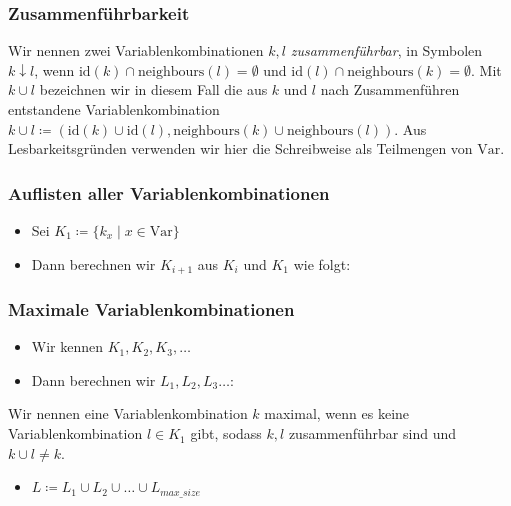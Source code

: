 \documentclass[onlymath]{beamer}
\begin{document}
\begin{frame}
	\frametitle{Zusammenführbarkeit}

	\begin{definition}[zusammenführbar]
		Wir nennen zwei Variablenkombinationen $k, l$ \emph{zusammenführbar}, in Symbolen $k \downarrow l$, wenn \pause $\mathrm{id}(k) \cap \mathrm{neighbours}(l) = \emptyset$ und \pause $\mathrm{id}(l) \cap \mathrm{neighbours}(k) = \emptyset$. \pause Mit $k \cup l$ bezeichnen wir in diesem Fall die aus $k$ und $l$ nach Zusammenführen entstandene Variablenkombination  $k \cup l \coloneqq (\mathrm{id}(k) \cup \mathrm{id}(l), \mathrm{neighbours}(k) \cup \mathrm{neighbours}(l))$. \pause Aus Lesbarkeitsgründen verwenden wir hier die Schreibweise als Teilmengen von $\mathrm{Var}$.
	\end{definition}
\end{frame}

\begin{frame}
	\frametitle{Auflisten aller Variablenkombinationen}
	\begin{itemize}
		\item Sei $K_1 \coloneqq \{k_x \mid x\in \mbox{Var} \}$ \pause
		\item Dann berechnen wir $K_{i+1}$ aus $K_i$ und $K_1$ wie folgt: \pause
	\end{itemize} 
\centering
\end{frame}

\begin{frame}
	\frametitle{Maximale Variablenkombinationen}
	\begin{itemize}
		\item Wir kennen $K_1, K_2, K_3, \dots $ \pause
		\item Dann berechnen wir $L_1, L_2, L_3 \dots$: \pause
	\end{itemize}
\begin{definition}
	Wir nennen eine Variablenkombination $k$ maximal, wenn es keine Variablenkombination $l\in K_1$ gibt, sodass $k, l$ zusammenführbar sind und $k \cup l \neq k$.
\end{definition} \pause
\begin{itemize}
	\item $L \coloneqq L_1 \cup L_2 \cup \dots \cup L_{max\_size}$
\end{itemize}
\end{frame}
\end{document}
